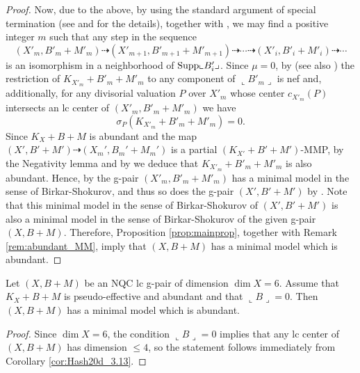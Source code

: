 \begin{proof}
		Now, due to the above, by using the standard argument of special termination (see \cite{LMT} and \cite[Remark 2.21]{Hash20d} for the details), together with \cite[Theorem 4.1]{HanLi22}, we may find a positive integer $m$ such that any step in the sequence
		$$(X'_m,B'_m+M'_m) \dashrightarrow (X'_{m+1},B'_{m+1}+M'_{m+1}) \dashrightarrow\cdots \dashrightarrow (X'_i,B'_i+M'_i)\dashrightarrow \cdots$$
		is an isomorphism in a neighborhood of $\operatorname{Supp} \llcorner B'_{i}\lrcorner$.
		Since $\mu=0$, by \cite[Lemma 3.8]{Hash22a} (see also \cite[Remark III.2.8 and Lemma V.1.9]{Nak04}) the restriction of 
		$K_{X'_m}+B'_m+M'_m$ to any component of $\llcorner B'_m\lrcorner$ is nef and, additionally, for any divisorial valuation $P$ over $X'_m$ whose center $c_{X'_m}(P)$ intersects an lc center of $(X'_m,B'_m+M'_m)$ we have
		$$ \sigma_{P}(K_{X'_m}+B'_m+M'_m)=0 . $$
		Since $K_{X}+B+M$ is abundant and the map $(X',B'+M') \dashrightarrow (X_m',B_m'+M_m')$ is a partial $(K_{X'}+B'+M')$-MMP, by the Negativity lemma and by \cite[Remark 2.15(2)]{Hash20d} we deduce that $K_{X'_m}+B'_m+M'_m$ is also abundant. Hence,
		by \cite[Theorem 3.14]{Hash22a} the g-pair $(X'_m,B'_m+M'_m)$ has a minimal model in the sense of Birkar-Shokurov, and thus so does the g-pair $(X',B'+M')$ by \cite[Corollary 3.20]{HaconLiu21}. Note that this minimal model in the sense of Birkar-Shokurov of $(X',B'+M')$ is also a minimal model in the sense of Birkar-Shokurov of the given g-pair $(X,B+M)$. Therefore, Proposition \ref{prop:mainprop}, together with Remark \ref{rem:abundant_MM}, imply that $(X,B+M)$ has a minimal model which is abundant.
	\end{proof}
	
	\begin{cor}\label{cor:Hash20d_3.12}
		Let $(X,B+M)$ be an NQC lc g-pair of dimension $\dim X = 6$. Assume that $K_X+B+M$ is pseudo-effective and abundant and that $\llcorner B \lrcorner = 0$. Then $(X,B+M)$ has a minimal model which is abundant.
	\end{cor}
	
	\begin{proof}
		Since $\dim X = 6$, the condition $\llcorner B \lrcorner =0$ implies that any lc center of $(X,B+M)$ has dimension $\leq 4$, so the statement follows immediately from Corollary \ref{cor:Hash20d_3.13}.
	\end{proof}
	
